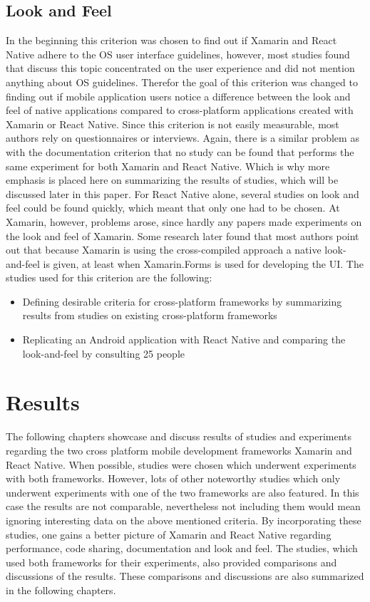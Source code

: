 \documentclass[Bachelor,BIF,english]{twbook}
\begin{document}
\subsection{Look and Feel}
In the beginning this criterion was chosen to find out if Xamarin and React Native adhere to the OS user interface guidelines, however, most studies found that discuss this topic concentrated on the user experience and did not mention anything about OS guidelines. Therefor the goal of this criterion was changed to finding out if mobile application users notice a difference between the look and feel of native applications compared to cross-platform applications created with Xamarin or React Native. Since this criterion is not easily measurable, most authors rely on questionnaires or interviews.
Again, there is a similar problem as with the documentation criterion that no study can be found that performs the same experiment for both Xamarin and React Native. Which is why more emphasis is placed here on summarizing the results of studies, which will be discussed later in this paper. For React Native alone, several studies on look and feel could be found quickly, which meant that only one had to be chosen. At Xamarin, however, problems arose, since hardly any papers made experiments on the look and feel of Xamarin. Some research later found that most authors point out that because Xamarin is using the cross-compiled approach a native look-and-feel is given, at least when Xamarin.Forms is used for developing the UI.
The studies used for this criterion are the following:
\begin{itemize}
\item Defining desirable criteria for cross-platform frameworks by summarizing results from studies on existing cross-platform frameworks\cite[p.~21]{GaouarBenamarBendimerad2016} \cite[p.~8]{tunali2015comparison}
\item Replicating an Android application with React Native and comparing the look-and-feel by consulting 25 people \cite[p.~16-18]{Danielsson_2016}
\end{itemize}

\section{Results}
The following chapters showcase and discuss results of studies and experiments regarding the two cross platform mobile development frameworks Xamarin and React Native. When possible, studies were chosen which underwent experiments with both frameworks. However, lots of other noteworthy studies which only underwent experiments with one of the two frameworks are also featured. In this case the results are not comparable, nevertheless not including them would mean ignoring interesting data on the above mentioned criteria. By incorporating these studies, one gains a better picture of Xamarin and React Native regarding performance, code sharing, documentation and look and feel. The studies, which used both frameworks for their experiments, also provided comparisons and discussions of the results. These comparisons and discussions are also summarized in the following chapters.
\end{document}
